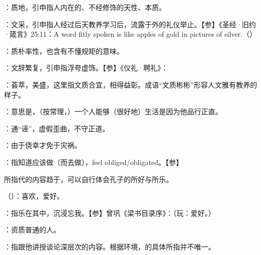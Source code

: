 {
\item {}：质地，引申指人内在的、不经修饰的天性、本质。

：文采，引申指人经过后天教养学习后，流露于外的礼仪举止。【参】《圣经·旧约·箴言》25:11：A word fitly spoken is like apples of gold in pictures of silver.（）
\item {}：质朴率性，也含有不懂规矩的意味。

：文辞繁复，引申指浮夸虚饰。【参】《仪礼·聘礼》：
\item {}：荟萃，美盛，这里指文质合宜，相得益彰。成语“文质彬彬”形容人文雅有教养的样子。
}
{}


{
\item {}：意思是，（按常理，）一个人能够（很好地）生活是因为他品行正直。
\item {}：通“诬”，虚假歪曲，不守正道。
\item {}：由于侥幸才免于灾祸。
}
{}


{
\item {}：指知道应该做（而去做），feel obliged/obligated。【参】

所指代的内容趋于，可以自行体会孔子的所好与所乐。
\item {}（）：喜欢，爱好。

\item {}：指乐在其中，沉浸忘我。【参】曾巩《梁书目录序》：（玩：爱好。）
}
{}


{
\item {}：资质普通的人。
\item {}：指跟他讲授谈论深层次的内容。根据环境，的具体所指并不唯一。
}
{}


